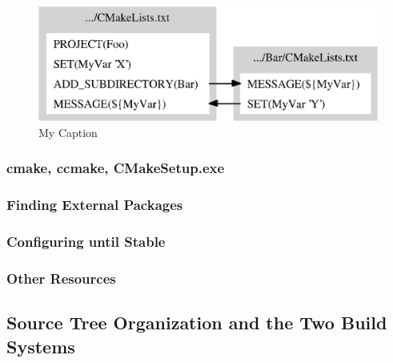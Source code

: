 \documentclass[letterpaper,10pt]{article}
\begin{document}


\begin{figure}
 \centering

\includegraphics{file-structure.eps}
 \caption{My Caption}
 \label{fig:foo}
\end{figure}







\subsubsection{cmake, ccmake, CMakeSetup.exe}
\subsubsection{Finding External Packages}
\subsubsection{Configuring until Stable}
\subsubsection{Other Resources}

\subsection{Source Tree Organization and the Two Build Systems}
\end{document}
